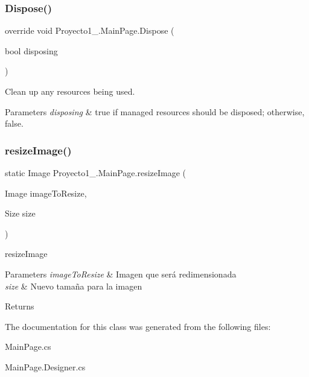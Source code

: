 \subsubsection{\texorpdfstring{Dispose()}{Dispose()}}
{\footnotesize\ttfamily override void Proyecto1\+\_.\+Main\+Page.\+Dispose (\begin{DoxyParamCaption}\item[{bool}]{disposing }\end{DoxyParamCaption})\hspace{0.3cm}{\ttfamily [protected]}}



Clean up any resources being used. 


\begin{DoxyParams}{Parameters}
{\em disposing} & true if managed resources should be disposed; otherwise, false.\\
\hline
\end{DoxyParams}
\mbox{\label{class_proyecto1__1096917_1_1_main_page_ac6f45a16f97ec2509701d3fafe7e4dda}} 
\subsubsection{\texorpdfstring{resize\+Image()}{resizeImage()}}
{\footnotesize\ttfamily static Image Proyecto1\+\_.\+Main\+Page.\+resize\+Image (\begin{DoxyParamCaption}\item[{Image}]{image\+To\+Resize,  }\item[{Size}]{size }\end{DoxyParamCaption})\hspace{0.3cm}{\ttfamily [static]}}



resize\+Image 


\begin{DoxyParams}{Parameters}
{\em image\+To\+Resize} & Imagen que será redimensionada\\
\hline
{\em size} & Nuevo tamaña para la imagen\\
\hline
\end{DoxyParams}
\begin{DoxyReturn}{Returns}

\end{DoxyReturn}


The documentation for this class was generated from the following files\+:\begin{DoxyCompactItemize}
\item 
Main\+Page.\+cs\item 
Main\+Page.\+Designer.\+cs\end{DoxyCompactItemize}
